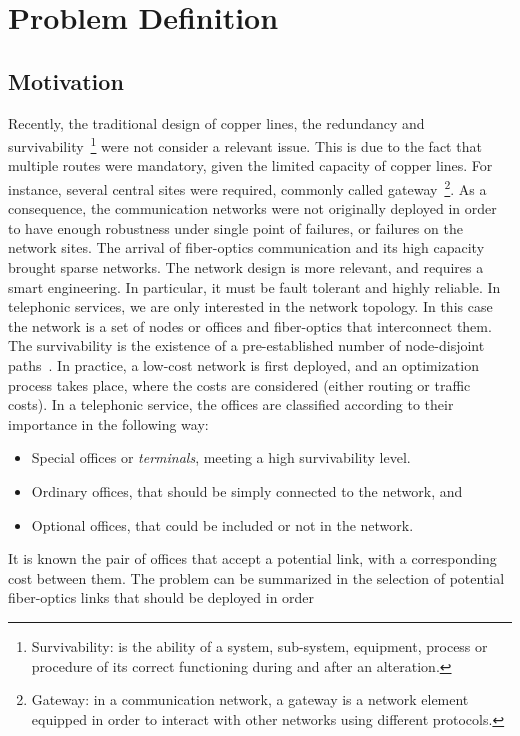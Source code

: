 \chapter{Problem Definition}\label{prob-def}
\section{Motivation}
Recently, the traditional design of copper lines, the redundancy and survivability~\footnote{Survivability: is the ability of a system, sub-system, equipment, process or procedure of 
    its correct functioning during and after an alteration.} were not consider a relevant issue. This is due to the fact that multiple routes were mandatory, given the limited capacity of copper lines. For instance, several central sites were required, commonly called gateway~\footnote{Gateway: in a communication network, 
    a gateway is a network element equipped in order to interact with other networks using different protocols.}.  As a consequence, the communication networks were not originally deployed in order to have enough robustness under single point of failures, or failures on the network sites. The arrival of fiber-optics communication and its 
    high capacity brought sparse networks. The network design is more relevant, and requires a smart engineering. 
In particular, it must be fault tolerant and highly reliable. In telephonic services, we are only interested in the network topology. In this case the network is a set of nodes or offices and fiber-optics that interconnect them. The survivability is the existence of a pre-established number of node-disjoint paths~\cite{98}. In practice, a low-cost network is first deployed, and an optimization process takes place, where the costs are considered (either routing or traffic costs). In a telephonic service, the offices are classified according 
to their importance in the following way:
\begin{itemize}
    \item Special offices or \emph{terminals}, meeting a high survivability level.
    \item Ordinary offices, that should be simply connected to the network, and
    \item Optional offices, that could be included or not in the network.
\end{itemize}
It is known the pair of offices that accept a potential link, with a corresponding cost between them. 
The problem can be summarized in the selection of potential fiber-optics links that should be deployed in order 
